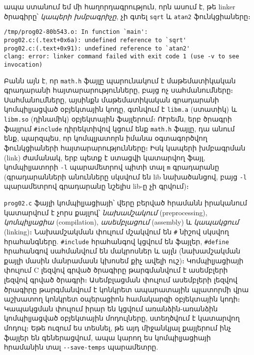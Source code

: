 \begin{Shaded}
\begin{Highlighting}[]
\NormalTok{$ }
\end{Highlighting}
\end{Shaded}

ապա ստանում եմ մի հաղորդագրություն, որն ասում է, թե linker ծրագիրը՝
\emph{կապերի խմբագրիչը}, չի գտել \texttt{sqrt} և \texttt{atan2}
ֆունկցիաները։

\begin{verbatim}
/tmp/prog02-80b543.o: In function `main':
prog02.c:(.text+0x6a): undefined reference to `sqrt'
prog02.c:(.text+0x91): undefined reference to `atan2'
clang: error: linker command failed with exit code 1 (use -v to see invocation)
\end{verbatim}

Բանն այն է, որ \texttt{math.h} ֆայլը պարունակում է մաթեմատիկական
գրադարանի հայտարարությունները, բայց ոչ սահմանումները։ Սահմանումները,
այսինքն մաթեմատիկական գրադարանի կոմպիլյացված օբյեկտային կոդը, գտնվում է
\texttt{libm.a} (ստատիկ) և \texttt{libm.so} (դինամիկ) օբյեկտային
ֆայլերում։ ՈՒրեմն, երբ ծրագրի ֆայլում \texttt{\#include} դիրեկտիվով
կցում ենք \texttt{math.h} ֆայլը, դա անում ենք, պարզպես, որ կոմպլյատորն
իմանա օգտագործվող ֆունկցիաների հայտարարությունները։ Իսկ կապերի խմբագրման
(link) ժամանակ, երբ պետք է ստացվի կատարվող ֆայլ, կոմպիլյատորի
\texttt{-l} պարամետրով պիտի տալ \texttt{m} գրադարանը (գրադարանների
անունները սկսվում են lib նախածանցով, բայց \texttt{-l} պարամետրով
գրադարանը նշելիս lib-ը չի գրվում)։

\texttt{prog02.c} ֆայլի կոմպիլյացիայի՝ վերը բերված հրամանն իրականում
կատարվում է չորս քայլով՝ \emph{նախամշակում} (preprocessing),
\emph{կոմպիլյացիա} (compilation), \emph{ասեմբլացում} (assembly) և
\emph{կապակցում} (linking)։ Նախամշակման փուլում մշակվում են \texttt{\#}
նիշով սկսվող հրահանգները. \texttt{\#include} հրահանգով կցվում են ֆայլեր,
\texttt{\#define} հրահանգով սահմանվում են մակրոսներ և այլն (նախամշակման
քայլի մասին մանրամասն կխոսեմ քիչ ավելի ուշ)։ Կոմպիլյացիայի փուլում C
լեզվով գրված ծրագիրը թարգմանվում է ասեմբլերի լեզվով գրված ծրագրի։
Ասեմբլացման փուլում ասեմբլերի լեզվով ծրագիրը թարգմանվում է կոնկրետ
ապարատային պլատորմի վրա աշխատող կոնկրետ օպերացիոն համակարգի օբյեկտային
կոդի։ Կապակցման փուլում իրար են կցվում առանձին-առանձին կոմպիլյացված
օբյեկտային մոդուլները, ստեղծվում է կատարվող մոդուլ։ Եթե ուզում ես
տեսնել, թե այդ միջանկյալ քայլերում ինչ ֆայլեր են գեներացվում, ապա կարող
ես կոմպիլյացիայի հրամանին տալ \texttt{-\/-save-temps} պարամետրը.

